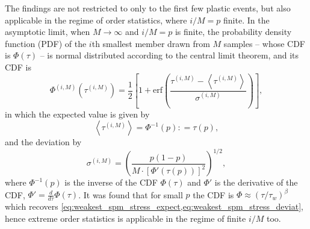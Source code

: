 The findings are not restricted to only to the first few plastic events, but also applicable in the regime of order statistics, where $i/M=p$ finite. In the asymptotic limit, when $M \to \infty$ and $i/M=p$ is finite, the probability density function (PDF)  of the $i$th smallest member drawn from $M$ samples -- whose CDF is $\Phi \left( \tau  \right)$ -- is normal distributed according to the central limit theorem, and its CDF is
\begin{equation} \label{eq:weakest_spm_stress_expect_large_i}
{\Phi ^{\left( {i,M} \right)}}\left( {{\tau ^{\left( {i,M} \right)}}} \right) = \frac{1}{2}\left[ {1 + {\text{erf}}\left( {\frac{{{\tau ^{\left( {i,M} \right)}} - \left\langle {{\tau ^{\left( {i,M} \right)}}} \right\rangle }}{{{\sigma ^{\left( {i,M} \right)}}}}} \right)} \right],
\end{equation}
in which the expected value is given by \cite{dasgupta2008asymptotic}
\begin{equation}
\left\langle {{\tau ^{\left( {i,M} \right)}}} \right\rangle  = {\Phi ^{ - 1}}\left( p \right): = \tau \left( p \right),
\end{equation}
and the deviation by
\begin{equation}
{\sigma ^{\left( {i,M} \right)}} = {\left( {\frac{{p\left( {1 - p} \right)}}{{M \cdot {{\left[ {\Phi '\left( {\tau \left( p \right)} \right)} \right]}^2}}}} \right)^{1/2}},
\end{equation}
where ${\Phi ^{ - 1}}\left( p \right)$ is the inverse of the CDF $\Phi \left( \tau \right)$ and $\Phi '$ is the derivative of the CDF, $\Phi ' = \frac{d}{{d\tau }}\Phi \left( \tau  \right)$. It was found that for small $p$ the CDF is $\Phi  \approx {\left( {\tau /{\tau _w}} \right)^\beta }$ which recovers \cref{eq:weakest_spm_stress_expect,eq:weakest_spm_stress_deviat}, hence extreme order statistics is applicable in the regime of finite $i/M$ too.


